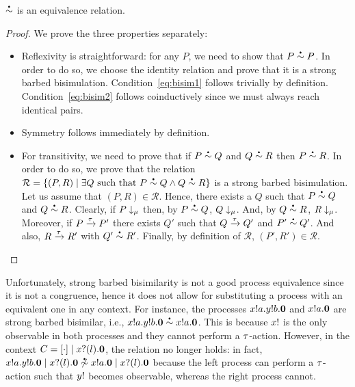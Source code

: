\begin{theorem}
  \( \sbbisim{}{} \) is an equivalence relation.
\end{theorem}
\begin{proof}
  We prove the three properties separately: 
  \begin{itemize}
  \item Reflexivity is straightforward: for any $P$, we need to show
    that $P\sbbisim{}{} P$. In order to do so, we choose the identity
    relation and prove that it is a strong barbed
    bisimulation. Condition~\ref{eq:bisim1} follows trivially by
    definition. Condition~\ref{eq:bisim2} follows coinductively since
    we must always reach identical pairs.
  \item Symmetry follows immediately by definition.
  \item For transitivity, we need to prove that if $P\sbbisim{}{} Q$
    and $Q\sbbisim{}{} R$ then $P\sbbisim{}{} R$. In order to do so,
    we prove that the relation
    $\mathcal R=\{(P,R)\mid \exists Q\text{ such that }P\sbbisim{}{} Q
    \land Q\sbbisim{}{} R\}$ is a strong barbed bisimulation. Let us
    assume that $(P,R)\in\mathcal R$. Hence, there exists a $Q$ such
    that $P\sbbisim{}{} Q$ and $Q\sbbisim{}{} R$. Clearly, if
    $P\downarrow_{\mu}$ then, by $P\sbbisim{}{} Q$,
    $Q\downarrow_{\mu}$. And, by $Q\sbbisim{}{} R$,
    $R\downarrow_{\mu}$. Moreover, if $P \xrightarrow{\tau} P'$
    there exists $Q'$ such that $Q \xrightarrow{\tau} Q'$ and
    $P'\sbbisim{}{}Q'$. And also, $R \xrightarrow{\tau} R'$ with
    $Q'\sbbisim{}{}R'$. Finally, by definition of $\mathcal R$,
    $(P',R')\in\mathcal R$.
  \end{itemize}
  
\end{proof}

Unfortunately, strong barbed bisimilarity is not a good process
equivalence since it is not a congruence, hence it does not allow for
substituting a process with an equivalent one in any context.
For instance, the processes $x ! a . y ! b . \bm{0}$ and
$x ! a . \bm{0}$ are strong barbed bisimilar, i.e.,
$\sbbisim{\Pout{x}{a}{\Pout{y}{b}{\Pend}}}{\Pout{x}{a}{\Pend}}$. This
is because \( x! \) is the only observable in both processes
and they cannot perform a \( \tau \)-action. However, in the context
$C = [\cdot] \mid x ? (l) . \bm{0}$, the relation no
longer holds: in fact,
$\nsbbisim{\Ppar{\Pout{x}{a}{\Pout{y}{b}{\Pend}}}{\Pin{x}{l}{\Pend}}}{\Pout{x}{a}{\Pend}\Ppar{}{\Pin{x}{l}{\Pend}}}$
%
because the left process can perform a \( \tau \)-action such that
\( y! \) becomes observable, whereas the right process cannot.

